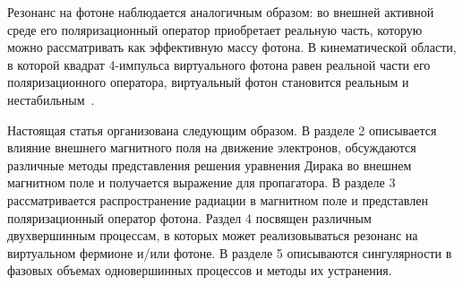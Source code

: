 
Резонанс на фотоне наблюдается аналогичным образом: во внешней активной среде его поляризационный оператор приобретает реальную часть, которую можно рассматривать как эффективную массу фотона. В кинематической 
области, в которой квадрат 4-импульса виртуального фотона равен реальной части 
его поляризационного оператора, виртуальный фотон становится реальным и 
нестабильным\textcolor{red}{~\cite{Rum_Q2012}}.

Настоящая статья организована следующим образом. В разделе 2 описывается влияние внешнего магнитного поля на движение электронов, обсуждаются различные методы представления решения уравнения Дирака во внешнем магнитном поле и получается выражение для пропагатора. В разделе 3 рассматривается распространение радиации в магнитном поле и представлен поляризационный оператор фотона. Раздел 4 посвящен различным двухвершинным процессам, в которых может 
реализовываться резонанс на виртуальном фермионе и/или фотоне. В разделе 5 описываются сингулярности в фазовых объемах одновершинных процессов и методы их устранения.